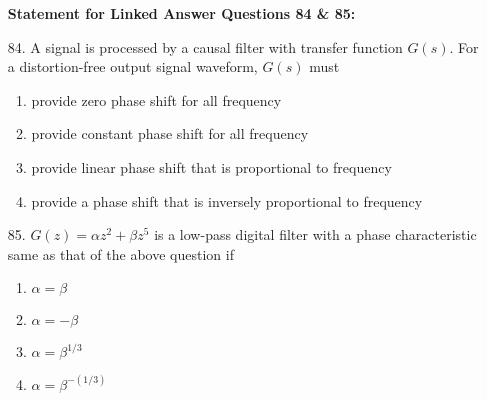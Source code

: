 \documentclass[journal,12pt,onecolumn]{IEEEtran}
\theoremstyle{remark}
\begin{document}
\begin{enumerate}
\textbf{Statement for Linked Answer Questions 84 \& 85:}


\item [84.] A signal is processed by a causal filter with transfer function $G(s)$. For a distortion-free output signal waveform, $G(s)$ must
    \begin{enumerate}
        \item provide zero phase shift for all frequency
        \item provide constant phase shift for all frequency
        \item provide linear phase shift that is proportional to frequency
        \item provide a phase shift that is inversely proportional to frequency
    \end{enumerate}

    \item [85.] $G(z) = \alpha z^2 + \beta z^5$ is a low-pass digital filter with a phase characteristic same as that of the above question if
    \begin{enumerate}
        \item $\alpha = \beta$
        \item $\alpha = -\beta$
        \item $\alpha = \beta^{1/3}$
        \item $\alpha = \beta^{-(1/3)}$
    \end{enumerate}

    
\end{enumerate}
\end{document}
